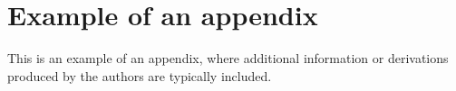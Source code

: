 \documentclass[12pt, a4paper, twoside, onecolumn]{article}
\begin{document}
\appendix
\section{Example of an appendix}

This is an example of an appendix, where additional information or derivations produced by the authors are typically included.


%
%


\end{document}
